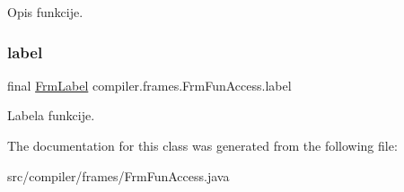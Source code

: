 Opis funkcije. \mbox{\label{classcompiler_1_1frames_1_1_frm_fun_access_a975ff47eb1fc06f534edf4990beb88c3}} 
\subsubsection{\texorpdfstring{label}{label}}
{\footnotesize\ttfamily final \hyperlink{classcompiler_1_1frames_1_1_frm_label}{Frm\+Label} compiler.\+frames.\+Frm\+Fun\+Access.\+label}

Labela funkcije. 

The documentation for this class was generated from the following file\+:\begin{DoxyCompactItemize}
\item 
src/compiler/frames/Frm\+Fun\+Access.\+java\end{DoxyCompactItemize}
